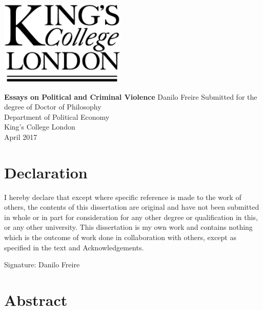 \documentclass[a4paper,12pt]{report}
\newcommand{\linespacing}{2}
\renewcommand{\baselinestretch}{\linespacing}
\begin{document}




\thispagestyle{empty}
\begin{center}
\includegraphics[width=6cm]{kcl.eps}
\end{center}	
\vskip40mm
\begin{center}
\huge\textbf{Essays on Political and Criminal Violence}
\vskip2mm
\vskip5mm
\Large Danilo Freire
\normalsize
\vfill
\large
Submitted for the degree of Doctor of Philosophy \\
Department of Political Economy \\
King's College London	\\
April 2017
\end{center}	


\chapter*{Declaration}
\noindent 
I hereby declare that except where specific reference is made to the work of others, the contents of this dissertation are original and have not been submitted in whole or in part for consideration for any other degree or qualification in this, or any other university. This dissertation is my own work and contains nothing which is the outcome of work done in collaboration with others, except as specified in the text and Acknowledgements. 


\vskip20mm
\noindent
Signature:
\vskip20mm
\noindent 
Danilo Freire


\chapter*{Abstract}
\renewcommand{\baselinestretch}{\linespacing}
\small\normalsize
\end{document}
